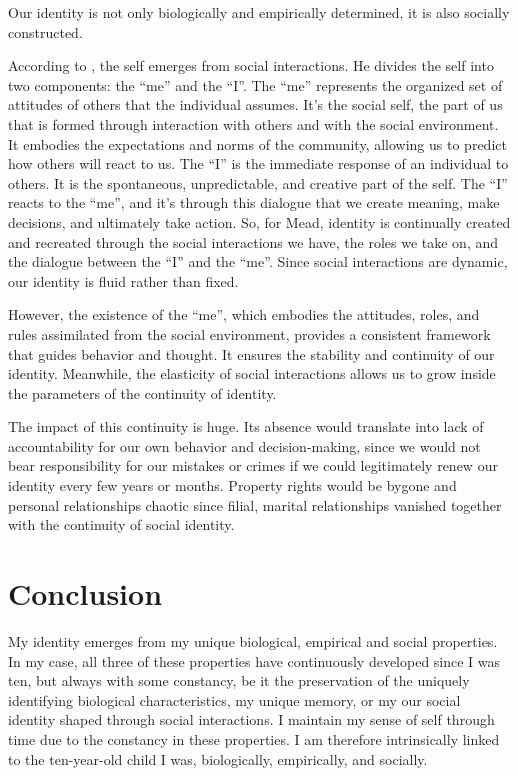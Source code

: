 \documentclass[a4paper,english,12pt]{scrartcl}
\begin{document}
Our identity is not only biologically and empirically
determined, it is also socially constructed.

According to \textcite{Mead1934MindSA}, the self emerges from social
interactions. He divides the self into two components: the ``me''
and the ``I''. The ``me'' represents the organized set of attitudes
of others that the individual assumes. It's the social self, the part
of us that is formed through interaction with others and with the
social environment. It embodies the expectations and norms of the
community, allowing us to predict how others will react to us. The
``I'' is the immediate response of an individual to others. It is
the spontaneous, unpredictable, and creative part of the self. The
``I'' reacts to the ``me'', and it's through this dialogue that
we create meaning, make decisions, and ultimately take action. So,
for Mead, identity is continually created and recreated through the
social interactions we have, the roles we take on, and the dialogue
between the ``I'' and the ``me''. Since social interactions are
dynamic, our identity is fluid rather than fixed.

However, the existence of the ``me'', which embodies the attitudes,
roles, and rules assimilated from the social environment, provides
a consistent framework that guides behavior and thought. It ensures
the stability and continuity of our identity. Meanwhile, the elasticity
of social interactions allows us to grow inside the parameters of
the continuity of identity.

The impact of this continuity is huge. Its absence would translate
into lack of accountability for our own behavior and decision-making,
since we would not bear responsibility for our mistakes or crimes
if we could legitimately renew our identity every few years or
months. Property rights would be bygone and personal relationships chaotic
since filial, marital relationships vanished together with the continuity
of social identity.

\section{Conclusion}

My identity emerges from my unique biological, empirical and social
properties. In my case, all three of these properties have continuously
developed since I was ten, but always with some constancy, be it the
preservation of the uniquely identifying biological characteristics,
my unique memory, or my our
social identity shaped through social interactions. I maintain my
sense of self through time due to the constancy in these properties.
I am therefore intrinsically linked to the ten-year-old child I was,
biologically, empirically, and socially.

\printbibliography
\end{document}
